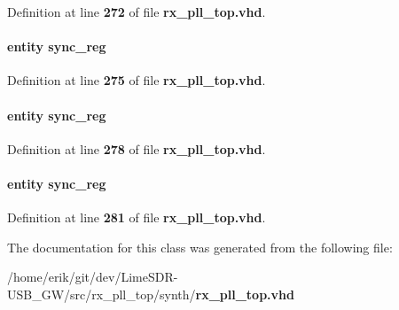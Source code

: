 Definition at line {\bf 272} of file {\bf rx\+\_\+pll\+\_\+top.\+vhd}.

\paragraph[{sync\+\_\+reg7}]{ {\bfseries \textcolor{keywordflow}{entity}\textcolor{vhdlchar}{ }\textcolor{vhdlchar}{sync\+\_\+reg}\textcolor{vhdlchar}{ }} \hspace{0.3cm}{\ttfamily [Instantiation]}}\label{classrx__pll__top_1_1arch_abc82c2116ca5d686a75265e0700ced0f}


Definition at line {\bf 275} of file {\bf rx\+\_\+pll\+\_\+top.\+vhd}.

\paragraph[{sync\+\_\+reg8}]{ {\bfseries \textcolor{keywordflow}{entity}\textcolor{vhdlchar}{ }\textcolor{vhdlchar}{sync\+\_\+reg}\textcolor{vhdlchar}{ }} \hspace{0.3cm}{\ttfamily [Instantiation]}}\label{classrx__pll__top_1_1arch_a0b58a7cce800b7229df5690cd0a3e1c2}


Definition at line {\bf 278} of file {\bf rx\+\_\+pll\+\_\+top.\+vhd}.

\paragraph[{sync\+\_\+reg9}]{ {\bfseries \textcolor{keywordflow}{entity}\textcolor{vhdlchar}{ }\textcolor{vhdlchar}{sync\+\_\+reg}\textcolor{vhdlchar}{ }} \hspace{0.3cm}{\ttfamily [Instantiation]}}\label{classrx__pll__top_1_1arch_ad427c2115b432af5129d6a9ccb7a4788}


Definition at line {\bf 281} of file {\bf rx\+\_\+pll\+\_\+top.\+vhd}.



The documentation for this class was generated from the following file\+:\begin{DoxyCompactItemize}
\item 
/home/erik/git/dev/\+Lime\+S\+D\+R-\/\+U\+S\+B\+\_\+\+G\+W/src/rx\+\_\+pll\+\_\+top/synth/{\bf rx\+\_\+pll\+\_\+top.\+vhd}\end{DoxyCompactItemize}
